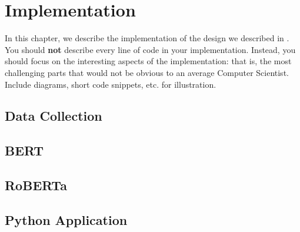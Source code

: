 \chapter{Implementation}
\label{ch:implementation}

In this chapter, we describe the implementation of the design we described in . You should \textbf{not} describe every line of code in your implementation. Instead, you should focus on the interesting aspects of the implementation: that is, the most challenging parts that would not be obvious to an average Computer Scientist. Include diagrams, short code snippets, etc. for illustration. 

\section{Data Collection}
\section{BERT}
\section{RoBERTa}
\section{Python Application}